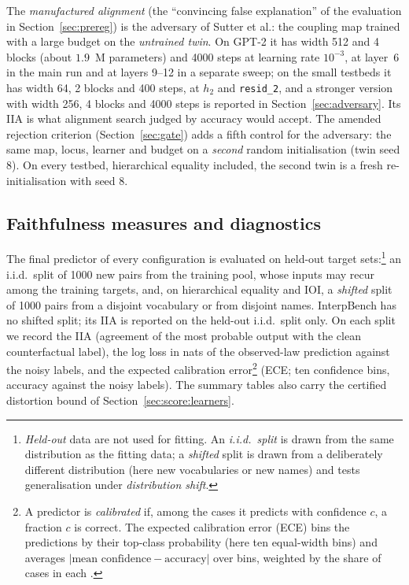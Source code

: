 \documentclass[11pt,a4paper]{article}
\begin{document}
The \emph{manufactured alignment} (the ``convincing false explanation'' of the evaluation in Section~\ref{sec:prereg}) is the adversary of Sutter et al.: the coupling map trained with a large budget on the \emph{untrained twin}. On GPT-2 it has width 512 and 4 blocks (about $1.9$~M parameters) and 4000 steps at learning rate $10^{-3}$, at layer~6 in the main run and at layers 9--12 in a separate sweep; on the small testbeds it has width 64, 2 blocks and 400 steps, at $h_2$ and \texttt{resid\_2}, and a stronger version with width 256, 4 blocks and 4000 steps is reported in Section~\ref{sec:adversary}. Its IIA is what alignment search judged by accuracy would accept. The amended rejection criterion (Section~\ref{sec:gate}) adds a fifth control for the adversary: the same map, locus, learner and budget on a \emph{second} random initialisation (twin seed 8). On every testbed, hierarchical equality included, the second twin is a fresh re-initialisation with seed 8.

\subsection{Faithfulness measures and diagnostics}
\label{sec:score:faith}

The final predictor of every configuration is evaluated on held-out target sets:\footnote{\emph{Held-out} data are not used for fitting. An \emph{i.i.d.\ split} is drawn from the same distribution as the fitting data; a \emph{shifted} split is drawn from a deliberately different distribution (here new vocabularies or new names) and tests generalisation under \emph{distribution shift}.} an i.i.d.\ split of 1000 new pairs from the training pool, whose inputs may recur among the training targets, and, on hierarchical equality and IOI, a \emph{shifted} split of 1000 pairs from a disjoint vocabulary or from disjoint names. InterpBench has no shifted split; its IIA is reported on the held-out i.i.d.\ split only. On each split we record the IIA (agreement of the most probable output with the clean counterfactual label), the log loss in nats of the observed-law prediction against the noisy labels, and the expected calibration error\footnote{A predictor is \emph{calibrated} if, among the cases it predicts with confidence $c$, a fraction $c$ is correct. The expected calibration error (ECE) bins the predictions by their top-class probability (here ten equal-width bins) and averages $|\text{mean confidence}-\text{accuracy}|$ over bins, weighted by the share of cases in each \cite{guo2017calibration}.} (ECE; ten confidence bins, accuracy against the noisy labels). The summary tables also carry the certified distortion bound of Section~\ref{sec:score:learners}.
\end{document}
